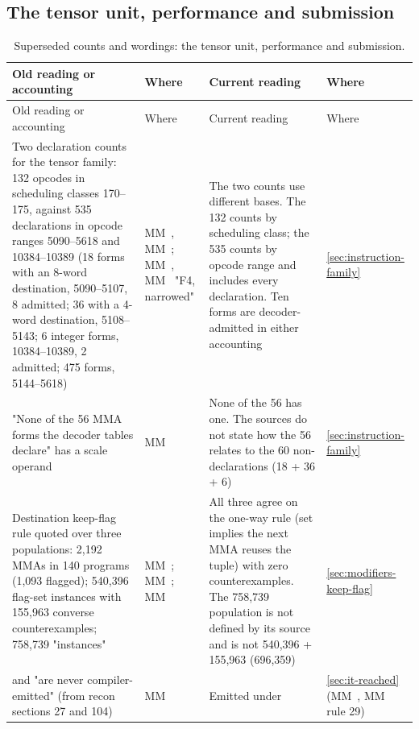 \subsection*{The tensor unit, performance and submission}\label{sub:tensor-unit-performance}

\begin{xltabular}{\linewidth}{@{}>{\hsize}X>{\hsize}X>{\hsize}X>{\hsize}X@{}}
\caption{Superseded counts and wordings: the tensor unit, performance and submission.}\label{tab:acct-tensor-submission}\\
\toprule
Old reading or accounting & Where & Current reading & Where \\
\midrule
\endfirsthead
{}
\toprule
Old reading or accounting & Where & Current reading & Where \\
\midrule
\endhead
Two declaration counts for the tensor family: 132 opcodes in scheduling
classes 170–175, against 535 declarations in opcode ranges 5090–5618 and
10384–10389 (18 forms with an 8-word destination, 5090–5107, 8 admitted;
36 with a 4-word destination, 5108–5143; 6 integer forms, 10384–10389, 2
admitted; 475  forms, 5144–5618) & MM~, MM~; MM~, MM~ "F4, narrowed" & The two counts use different bases. The 132 counts by
scheduling class; the 535 counts by opcode range and includes every  declaration.
Ten forms are decoder-admitted in either accounting & \cref{sec:instruction-family} \\
"None of the 56 MMA forms the decoder tables declare" has a scale
operand & MM~ & None of the 56 has one. The sources do not state how the 56 relates to the 60
non- declarations (18 + 36 + 6) & \cref{sec:instruction-family} \\
Destination keep-flag rule quoted over three populations: 2,192 MMAs in
140 programs (1,093 flagged); 540,396 flag-set instances with 155,963
converse counterexamples; 758,739 "instances" & MM~; MM~; MM~ & All three agree on the one-way rule (set implies the next MMA reuses the
tuple) with zero counterexamples. The 758,739 population is not defined
by its source and is not 540,396 + 155,963 (696,359) & \cref{sec:modifiers-keep-flag} \\
 and  "are never
compiler-emitted" (from recon sections 27 and 104) & MM~ & Emitted under  & \cref{sec:it-reached} (MM~, MM~ rule 29) \\

\end{xltabular}
